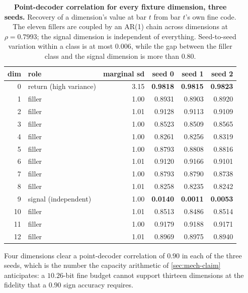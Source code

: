 \begin{table}[h]
  \centering
  \small
  \caption{\textbf{Point-decoder correlation for every fixture dimension, three seeds.} Recovery of
  a dimension's value at bar $t$ from bar $t$'s own fine code. The eleven fillers are coupled by an
  AR(1) chain across dimensions at $\rho = 0.7993$; the signal dimension is independent of
  everything. Seed-to-seed variation within a class is at most $0.006$, while the gap between the
  filler class and the signal dimension is more than $0.80$.}
  \label{tab:eviction-full}
  \begin{tabular}{@{}rlrrrr@{}}
    \toprule
    dim & role & marginal sd & seed 0 & seed 1 & seed 2 \\
    \midrule
    0 & return (high variance) & 3.15 & \textbf{0.9818} & \textbf{0.9815} & \textbf{0.9823} \\
    1 & filler & 1.00 & 0.8931 & 0.8903 & 0.8920 \\
    2 & filler & 1.01 & 0.9128 & 0.9113 & 0.9109 \\
    3 & filler & 1.00 & 0.8523 & 0.8509 & 0.8565 \\
    4 & filler & 1.00 & 0.8261 & 0.8256 & 0.8319 \\
    5 & filler & 1.00 & 0.8793 & 0.8808 & 0.8816 \\
    6 & filler & 1.01 & 0.9120 & 0.9166 & 0.9101 \\
    7 & filler & 1.00 & 0.8793 & 0.8790 & 0.8738 \\
    8 & filler & 1.01 & 0.8258 & 0.8235 & 0.8242 \\
    9 & signal (independent) & 1.00 & \textbf{0.0140} & \textbf{0.0011} & \textbf{0.0053} \\
    10 & filler & 1.01 & 0.8513 & 0.8486 & 0.8514 \\
    11 & filler & 1.00 & 0.9179 & 0.9188 & 0.9171 \\
    12 & filler & 1.01 & 0.8969 & 0.8975 & 0.8940 \\
    \bottomrule
  \end{tabular}
\end{table}

Four dimensions clear a point-decoder correlation of $0.90$ in each of the three seeds, which is
the number the capacity arithmetic of \cref{sec:mech-claim} anticipates: a $10.26$-bit fine budget
cannot support thirteen dimensions at the fidelity that a $0.90$ sign accuracy requires.

